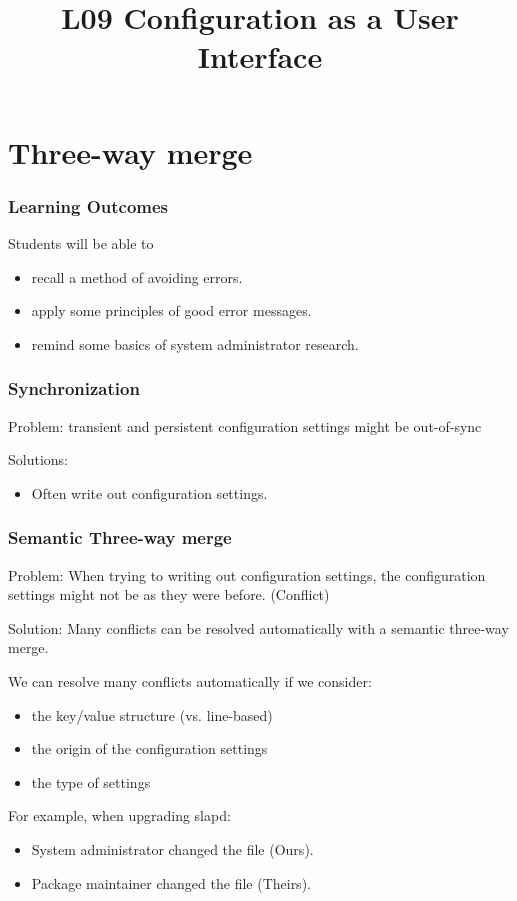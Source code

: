 

\title{L09 Configuration as a User Interface}




\section{Three-way merge}


\begin{frame}
	\frametitle{Learning Outcomes}
	Students will be able to
	\begin{itemize}
	\item recall a method of avoiding errors.
	\item apply some principles of good error messages.
	\item remind some basics of system administrator research.
	\end{itemize}
\end{frame}


\begin{frame}
	\frametitle{Synchronization}

	Problem: transient and persistent configuration settings might be out-of-sync~\cite{jin2014configurations}

	\pause


	\pause

	Solutions:
	\begin{itemize}
	\item Often write out configuration settings.
	\end{itemize}
\end{frame}

\begin{frame}
	\frametitle{Semantic Three-way merge}

	Problem: When trying to writing out configuration settings, the configuration settings might not be as they were before. (Conflict)

	\pause

	Solution: Many conflicts can be resolved automatically with a semantic three-way merge.

	\pause

	We can resolve many conflicts automatically if we consider:
	\begin{itemize}[<+-| alert@+>]
	\item the key/value structure (vs. line-based)
	\item the origin of the configuration settings
	\item the type of settings
	\end{itemize}

	\pause[\thebeamerpauses]

	For example, when upgrading slapd:
	\begin{itemize}
	\item System administrator changed the file (Ours).
	\item Package maintainer changed the file (Theirs).
	\end{itemize}
\end{frame}

